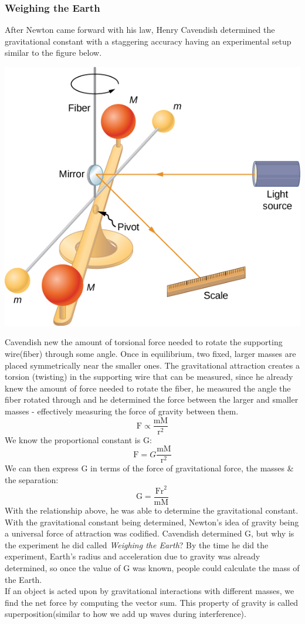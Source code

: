 \documentclass[9pt]{article}
\begin{document}
	\subsubsection*{Weighing the Earth}
	After Newton came forward with his law, Henry Cavendish determined the gravitational constant with a staggering accuracy having an experimental setup similar to the figure below.
	\begin{center}
		\includegraphics[scale=0.7]{weighing_the_earth.jpeg}	
	\end{center}
	Cavendish new the amount of torsional force needed to rotate the supporting wire(fiber) through some angle. Once in equilibrium, two fixed, larger masses are placed symmetrically near the smaller ones. The gravitational attraction creates a torsion (twisting) in the supporting wire that can be measured, since he already knew the amount of force needed to rotate the fiber, he measured the angle the fiber rotated through and he determined the force between the larger and smaller masses - effectively measuring the force of gravity between them.
	$$\text{F}\propto\dfrac{\text{mM}}{\text{r}^2}$$
	We know the proportional constant is G:
	$$\text{F} = G\dfrac{\text{mM}}{\text{r}^2}$$
	We can then express G in terms of the force of gravitational force, the masses \& the separation:
	$$\text{G} = \dfrac{\text{Fr}^2}{\text{mM}}$$
	With the relationship above, he was able to determine the gravitational constant. With the gravitational constant being determined, Newton's idea of gravity being a universal force of attraction was codified. Cavendish determined G, but why is the experiment he did called \textit{Weighing the Earth}? By the time he did the experiment, Earth's radius and acceleration due to gravity was already determined, so once the value of G was known, people could calculate the mass of the Earth. \\
	If an object is acted upon by gravitational interactions with different masses, we find the net force by computing the vector sum. This property of gravity is called superposition(similar to how we add up waves during interference). 
\end{document}
